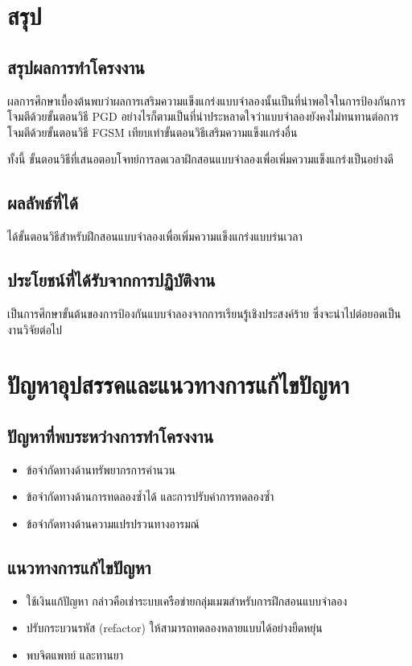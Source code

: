 \section{สรุป}

\subsection{สรุปผลการทำโครงงาน}

ผลการศึกษาเบื้องต้นพบว่าผลการเสริมความแข็งแกร่งแบบจำลองนั้นเป็นที่น่าพอใจในการป้องกันการโจมตีด้วยขั้นตอนวิธี PGD อย่างไรก็ตามเป็นที่น่าประหลาดใจว่าแบบจำลองยังคงไม่ทนทานต่อการโจมตีด้วยขั้นตอนวิธี FGSM เทียบเท่าขั้นตอนวิธีเสริมความแข็งแกร่งอื่น

ทั้งนี้ ขั้นตอนวิธีที่เสนอตอบโจทย์การลดเวลาฝึกสอนแบบจำลองเพื่อเพิ่มความแข็งแกร่งเป็นอย่างดี

\subsection{ผลลัพธ์ที่ได้}

ได้ขั้นตอนวิธีสำหรับฝึกสอนแบบจำลองเพื่อเพิ่มความแข็งแกร่งแบบร่นเวลา

\subsection{ประโยชน์ที่ได้รับจากการปฏิบัติงาน}

เป็นการศึกษาขั้นต้นของการป้องกันแบบจำลองจากการเรียนรู้เชิงประสงค์ร้าย ซึ่งจะนำไปต่อยอดเป็นงานวิจัยต่อไป

\section{ปัญหาอุปสรรคและแนวทางการแก้ไขปัญหา}

\subsection{ปัญหาที่พบระหว่างการทำโครงงาน}

\begin{itemize}
    \item ข้อจำกัดทางด้านทรัพยากรการคำนวน
    \item ข้อจำกัดทางด้านการทดลองซ้ำได้ และการปรับค่าการทดลองซ้ำ
    \item ข้อจำกัดทางด้านความแปรปรวนทางอารมณ์
\end{itemize}

\subsection{แนวทางการแก้ไขปัญหา}

\begin{itemize}
    \item ใช้เงินแก้ปัญหา กล่าวคือเช่าระบบเครือข่ายกลุ่มเมฆสำหรับการฝึกสอนแบบจำลอง
    \item ปรับกระบวนรหัส (refactor) ให้สามารถทดลองหลายแบบได้อย่างยืดหยุ่น
    \item พบจิตแพทย์ และทานยา
\end{itemize}
